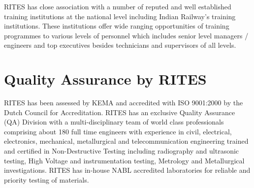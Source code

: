 \bigskip

{\color[rgb]{0.0,0.0,0.039215688}
RITES has close association with a number of reputed and well established training institutions at the national level
including Indian Railway's training institutions. These institutions offer wide ranging opportunities of training
programmes to various levels of personnel which includes senior level managers / engineers and top executives besides
technicians and supervisors of all levels.}


\bigskip


\section{Quality Assurance by RITES}







RITES has been assessed by KEMA and accredited with ISO 9001:2000 by the Dutch Council for Accreditation.  RITES has an exclusive Quality Assurance (QA) Division with a multi-disciplinary team of world class professionals comprising about 180 full time engineers with experience in civil, electrical, electronics, mechanical, metallurgical and telecommunication engineering trained and certified in Non-Destructive Testing including radiography and ultrasonic testing, High Voltage and instrumentation testing, Metrology and Metallurgical investigations. RITES has in-house NABL accredited laboratories for reliable and priority testing of materials.


